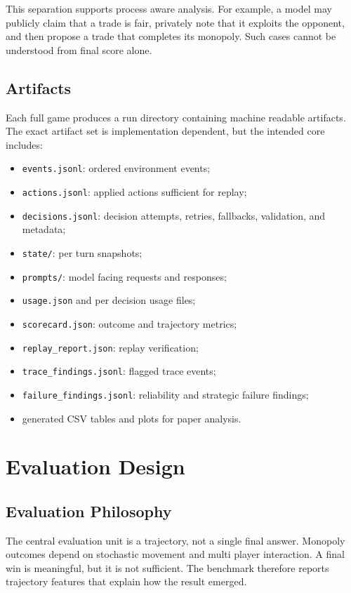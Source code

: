 \documentclass[conference]{IEEEtran}
\begin{document}
This separation supports process aware analysis. For example, a model may publicly claim that a trade is fair, privately note that it exploits the opponent, and then propose a trade that completes its monopoly. Such cases cannot be understood from final score alone.

\subsection{Artifacts}

Each full game produces a run directory containing machine readable artifacts. The exact artifact set is implementation dependent, but the intended core includes:

\begin{itemize}
    \item \texttt{events.jsonl}: ordered environment events;
    \item \texttt{actions.jsonl}: applied actions sufficient for replay;
    \item \texttt{decisions.jsonl}: decision attempts, retries, fallbacks, validation, and metadata;
    \item \texttt{state/}: per turn snapshots;
    \item \texttt{prompts/}: model facing requests and responses;
    \item \texttt{usage.json} and per decision usage files;
    \item \texttt{scorecard.json}: outcome and trajectory metrics;
    \item \texttt{replay\_report.json}: replay verification;
    \item \texttt{trace\_findings.jsonl}: flagged trace events;
    \item \texttt{failure\_findings.jsonl}: reliability and strategic failure findings;
    \item generated CSV tables and plots for paper analysis.
\end{itemize}

\section{Evaluation Design}
\label{sec:evaluation}

\subsection{Evaluation Philosophy}

The central evaluation unit is a trajectory, not a single final answer. Monopoly outcomes depend on stochastic movement and multi player interaction. A final win is meaningful, but it is not sufficient. The benchmark therefore reports trajectory features that explain how the result emerged.
\end{document}
